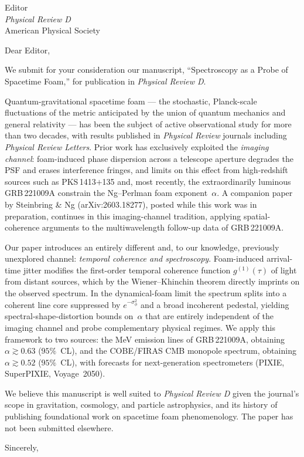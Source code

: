 \documentclass[12pt]{letter}
\begin{document}
\begin{letter}{Editor\\
\textit{Physical Review D}\\
American Physical Society}

\opening{Dear Editor,}

We submit for your consideration our manuscript, ``Spectroscopy as a Probe of
Spacetime Foam,'' for publication in \textit{Physical Review D}.

Quantum-gravitational spacetime foam --- the stochastic, Planck-scale
fluctuations of the metric anticipated by the union of quantum mechanics and
general relativity --- has been the subject of active observational study for
more than two decades, with results published in \textit{Physical Review}
journals including \textit{Physical Review Letters}.  Prior work has
exclusively exploited the \emph{imaging channel}: foam-induced phase dispersion
across a telescope aperture degrades the PSF and erases interference fringes,
and limits on this effect from high-redshift sources such as PKS\,1413$+$135
and, most recently, the extraordinarily luminous GRB\,221009A constrain the
Ng--Perlman foam exponent~$\alpha$.  A companion paper by Steinbring \& Ng
(arXiv:2603.18277), posted while this work was in preparation, continues in
this imaging-channel tradition, applying spatial-coherence arguments to the
multiwavelength follow-up data of GRB\,221009A.

Our paper introduces an entirely different and, to our knowledge, previously
unexplored channel: \emph{temporal coherence and spectroscopy}.  Foam-induced
arrival-time jitter modifies the first-order temporal coherence function
$g^{(1)}(\tau)$ of light from distant sources, which by the
Wiener--Khinchin theorem directly imprints on the observed spectrum.  In the
dynamical-foam limit the spectrum splits into a coherent line core suppressed
by $e^{-\sigma_\phi^2}$ and a broad incoherent pedestal, yielding
spectral-shape-distortion bounds on~$\alpha$ that are entirely independent of
the imaging channel and probe complementary physical regimes.  We apply this
framework to two sources: the MeV emission lines of GRB\,221009A, obtaining
$\alpha \gtrsim 0.63$ ($95\%$~CL), and the COBE/FIRAS CMB monopole spectrum,
obtaining $\alpha \gtrsim 0.52$ ($95\%$~CL), with forecasts for next-generation
spectrometers (PIXIE, SuperPIXIE, Voyage~2050).

We believe this manuscript is well suited to \textit{Physical Review D} given
the journal's scope in gravitation, cosmology, and particle astrophysics, and
its history of publishing foundational work on spacetime foam phenomenology.
The paper has not been submitted elsewhere.

\closing{Sincerely,}

\end{letter}
\end{document}
